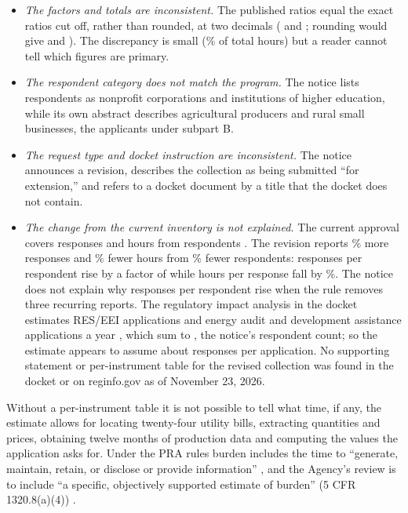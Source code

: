 \documentclass[11pt]{article}
\begin{document}
\begin{itemize}
\item \emph{The factors and totals are inconsistent.} The published ratios equal the exact
ratios cut off, rather than rounded, at two decimals (\AuditImpliedResponsesPerRespondent{}
and \AuditImpliedHoursPerResponse; rounding would give
\AuditRoundedResponsesPerRespondent{} and \AuditRoundedHoursPerResponse). The discrepancy
is small (\AuditHoursDiscrepancyPct\% of total hours) but a reader cannot tell which
figures are primary.
\item \emph{The respondent category does not match the program.} The notice lists
respondents as nonprofit corporations and institutions of higher education, while its own
abstract describes agricultural producers and rural small businesses, the applicants
under subpart B.
\item \emph{The request type and docket instruction are inconsistent.} The notice
announces a revision, describes the collection as being submitted ``for extension,'' and
refers to a docket document by a title that the docket does not contain.
\item \emph{The change from the current inventory is not explained.} The current
approval covers \InvResponses{} responses and \InvHours{} hours from \InvRespondents{}
respondents \cite{omb05700067}. The revision reports \ChangeResponsesPct\% more responses
and \ChangeHoursPct\% fewer hours from \ChangeRespondentsPct\% fewer respondents:
responses per respondent rise by a factor of \ChangeResponsesPerRespondentFactor{} while
hours per response fall by \ChangeHoursPerResponsePct\%. The notice does not
explain why responses per respondent rise when the rule removes three recurring reports. The
regulatory impact analysis in the docket estimates \RiaApplications{} RES/EEI applications
and \RiaEaReda{} energy audit and development assistance applications a year
\cite{ria2026reap}, which sum to \RiaTotal, the notice's respondent count; so the estimate
appears to assume about \AuditResponsesPerRespondent{} responses per application. No
supporting statement or per-instrument table for the revised collection was found in the
docket or on reginfo.gov as of November 23, 2026.
\end{itemize}

Without a per-instrument table it is not possible to tell what time, if any, the estimate
allows for locating twenty-four utility bills, extracting quantities and prices,
obtaining twelve months of production data and computing the values the application
asks for. Under the PRA rules burden includes the time to ``generate, maintain, retain,
or disclose or provide information'' \cite{cfr1320_3}, and the Agency's review is to
include ``a specific, objectively supported estimate of burden''
(5 CFR 1320.8(a)(4)) \cite{cfr1320_8}.
\end{document}
